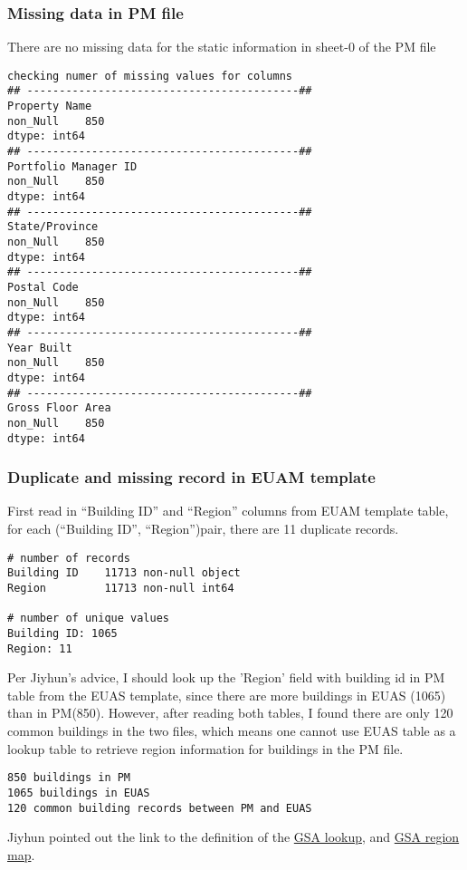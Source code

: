 \documentclass[12pt]{article}
\begin{document}
\subsubsection{Missing data in PM file}
There are no missing data for the static information in sheet-0 of the PM file
\begin{verbatim}
checking numer of missing values for columns
## ------------------------------------------##
Property Name
non_Null    850
dtype: int64
## ------------------------------------------##
Portfolio Manager ID
non_Null    850
dtype: int64
## ------------------------------------------##
State/Province
non_Null    850
dtype: int64
## ------------------------------------------##
Postal Code
non_Null    850
dtype: int64
## ------------------------------------------##
Year Built
non_Null    850
dtype: int64
## ------------------------------------------##
Gross Floor Area
non_Null    850
dtype: int64
\end{verbatim}

\subsubsection{Duplicate and missing record in EUAM template}
First read in ``Building ID'' and ``Region'' columns from EUAM
template table, for each (``Building ID'', ``Region'')pair, there are
11 duplicate records.

\begin{verbatim}
# number of records
Building ID    11713 non-null object
Region         11713 non-null int64

# number of unique values
Building ID: 1065
Region: 11
\end{verbatim}

Per Jiyhun's advice, I should look up the 'Region' field with building
id in PM table from the EUAS template, since there are more buildings
in EUAS (1065) than in PM(850). However, after reading both tables, I
found there are only 120 common buildings in the two files, which
means one cannot use EUAS table as a lookup table to retrieve region
information for buildings in the PM file.

\begin{verbatim}
850 buildings in PM
1065 buildings in EUAS
120 common building records between PM and EUAS
\end{verbatim}

Jiyhun pointed out the link to the definition of the
\href{http://www.gsa.gov/portal/category/22227}{GSA lookup}, and
\href{http://www.gsa.gov/graphics/pbs/RWAmap.pdf}{GSA region map}. 
\end{document}
